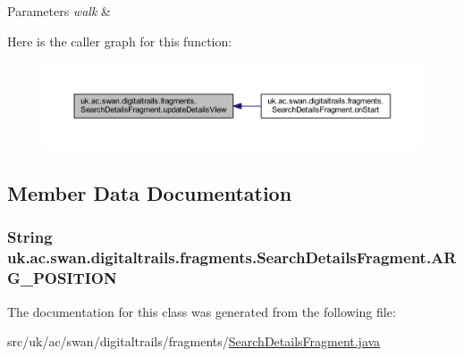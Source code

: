 \begin{DoxyParams}{Parameters}
{\em walk} & \\
\hline
\end{DoxyParams}


Here is the caller graph for this function\+:\nopagebreak
\begin{figure}[H]
\begin{center}
\leavevmode
\includegraphics[width=350pt]{classuk_1_1ac_1_1swan_1_1digitaltrails_1_1fragments_1_1_search_details_fragment_a30a52dee58e0523db1319bd1b5dfdc77_icgraph}
\end{center}
\end{figure}




\subsection{Member Data Documentation}
\hypertarget{classuk_1_1ac_1_1swan_1_1digitaltrails_1_1fragments_1_1_search_details_fragment_aad25040ec92e3ffc5c69918cfa23a20b}{
\subsubsection[{A\+R\+G\+\_\+\+P\+O\+S\+I\+T\+I\+O\+N}]{\setlength{\rightskip}{0pt plus 5cm}String uk.\+ac.\+swan.\+digitaltrails.\+fragments.\+Search\+Details\+Fragment.\+A\+R\+G\+\_\+\+P\+O\+S\+I\+T\+I\+O\+N\hspace{0.3cm}{\ttfamily [static]}}}\label{classuk_1_1ac_1_1swan_1_1digitaltrails_1_1fragments_1_1_search_details_fragment_aad25040ec92e3ffc5c69918cfa23a20b}


The documentation for this class was generated from the following file\+:\begin{DoxyCompactItemize}
\item 
src/uk/ac/swan/digitaltrails/fragments/\hyperlink{_search_details_fragment_8java}{Search\+Details\+Fragment.\+java}\end{DoxyCompactItemize}
